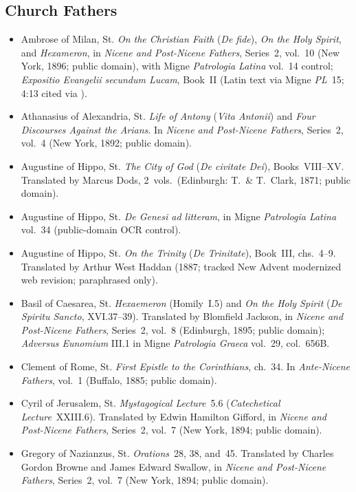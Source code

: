 \subsection{Church Fathers}
\begin{itemize}
\item Ambrose of Milan, St. \emph{On the Christian Faith} (\emph{De fide}), \emph{On the Holy Spirit}, and \emph{Hexameron}, in \emph{Nicene and Post-Nicene Fathers}, Series~2, vol.~10 (New York, 1896; public domain), with Migne \emph{Patrologia Latina} vol.~14 control; \emph{Expositio Evangelii secundum Lucam}, Book~II (Latin text via Migne \emph{PL}~15; 4:13 cited via ).
\item Athanasius of Alexandria, St. \emph{Life of Antony} (\emph{Vita Antonii}) and \emph{Four Discourses Against the Arians}. In \emph{Nicene and Post-Nicene Fathers}, Series~2, vol.~4 (New York, 1892; public domain).
\item Augustine of Hippo, St. \emph{The City of God} (\emph{De civitate Dei}), Books~VIII--XV. Translated by Marcus Dods, 2~vols.\ (Edinburgh: T.\ \& T.~Clark, 1871; public domain).
\item Augustine of Hippo, St. \emph{De Genesi ad litteram}, in Migne \emph{Patrologia Latina} vol.~34 (public-domain OCR control).
\item Augustine of Hippo, St. \emph{On the Trinity} (\emph{De Trinitate}), Book~III, chs.~4--9. Translated by Arthur West Haddan (1887; tracked New Advent modernized web revision; paraphrased only).
\item Basil of Caesarea, St. \emph{Hexaemeron} (Homily~I.5) and \emph{On the Holy Spirit} (\emph{De Spiritu Sancto}, XVI.37--39). Translated by Blomfield Jackson, in \emph{Nicene and Post-Nicene Fathers}, Series~2, vol.~8 (Edinburgh, 1895; public domain); \emph{Adversus Eunomium} III.1 in Migne \emph{Patrologia Graeca} vol.~29, col.~656B.
\item Clement of Rome, St. \emph{First Epistle to the Corinthians}, ch.~34. In \emph{Ante-Nicene Fathers}, vol.~1 (Buffalo, 1885; public domain).
\item Cyril of Jerusalem, St. \emph{Mystagogical Lecture}~5.6 (\emph{Catechetical Lecture}~XXIII.6). Translated by Edwin Hamilton Gifford, in \emph{Nicene and Post-Nicene Fathers}, Series~2, vol.~7 (New York, 1894; public domain).
\item Gregory of Nazianzus, St. \emph{Orations}~28, 38, and~45. Translated by Charles Gordon Browne and James Edward Swallow, in \emph{Nicene and Post-Nicene Fathers}, Series~2, vol.~7 (New York, 1894; public domain).

\end{itemize}
